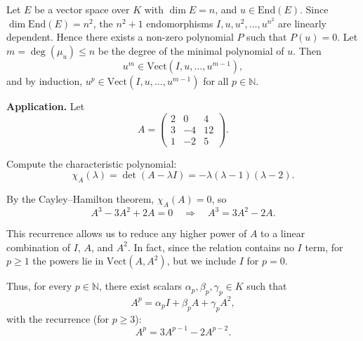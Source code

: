 \documentclass[12pt]{article}
\begin{document}
\begin{correctionbox}
Let $ E $ be a vector space over $ K $ with $ \dim E = n $, and $ u \in \mathrm{End}(E) $.  
Since $ \dim \mathrm{End}(E) = n^2 $, the $ n^2 + 1 $ endomorphisms $ I, u, u^2, \dots, u^{n^2} $ are linearly dependent. Hence there exists a non-zero polynomial $ P $ such that $ P(u) = 0 $. Let $ m = \deg(\mu_u) \leq n $ be the degree of the minimal polynomial of $ u $. Then
\[
u^m \in \mathrm{Vect}(I, u, \dots, u^{m-1}),
\]
and by induction, $ u^p \in \mathrm{Vect}(I, u, \dots, u^{m-1}) $ for all $ p \in \mathbb{N} $.

\medskip

\noindent\textbf{Application.} Let 
\[
A = \begin{pmatrix}
2 & 0 & 4 \\
3 & -4 & 12 \\
1 & -2 & 5
\end{pmatrix}.
\]

Compute the characteristic polynomial:
\[
\chi_A(\lambda) = \det(A - \lambda I) = -\lambda(\lambda - 1)(\lambda - 2).
\]

By the Cayley–Hamilton theorem, $ \chi_A(A) = 0 $, so
\[
A^3 - 3A^2 + 2A = 0 \quad \Longrightarrow \quad A^3 = 3A^2 - 2A.
\]

This recurrence allows us to reduce any higher power of $ A $ to a linear combination of $ I $, $ A $, and $ A^2 $. In fact, since the relation contains no $ I $ term, for $ p \geq 1 $ the powers lie in $ \mathrm{Vect}(A, A^2) $, but we include $ I $ for $ p = 0 $.

Thus, for every $ p \in \mathbb{N} $, there exist scalars $ \alpha_p, \beta_p, \gamma_p \in K $ such that
\[
A^p = \alpha_p I + \beta_p A + \gamma_p A^2,
\]
with the recurrence (for $ p \geq 3 $):
\[
A^p = 3A^{p-1} - 2A^{p-2}.
\]

\end{correctionbox}
\end{document}
